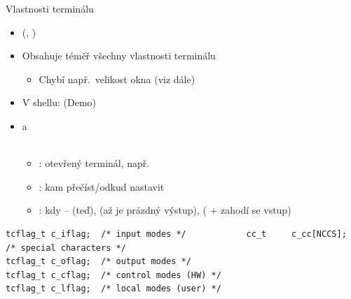 \begin{frame}[fragile]{Vlastnosti terminálu}

  \begin{itemize}
    \item {} (, )

    \pause

    \item Obsahuje téměř všechny vlastnosti terminálu
    \begin{itemize}
      \item Chybí např.\ velikost okna (viz dále)
    \end{itemize}

    \pause

    \item V shellu:  (Demo)

    \pause

    \item {} a \\
      \\
    \begin{itemize}
      \item {}: otevřený terminál, např.\ 
      \item {}: kam přečíst/odkud nastavit
      \item {}: kdy --  (teď),
	 (až je prázdný výstup), 
	( + zahodí se vstup)
    \end{itemize}

  \end{itemize}

  \begin{block}{}
  \begin{lstlisting}
tcflag_t c_iflag;  /* input modes */            cc_t     c_cc[NCCS];  /* special characters */
tcflag_t c_oflag;  /* output modes */
tcflag_t c_cflag;  /* control modes (HW) */
tcflag_t c_lflag;  /* local modes (user) */
  \end{lstlisting}
  \end{block}

\end{frame}

